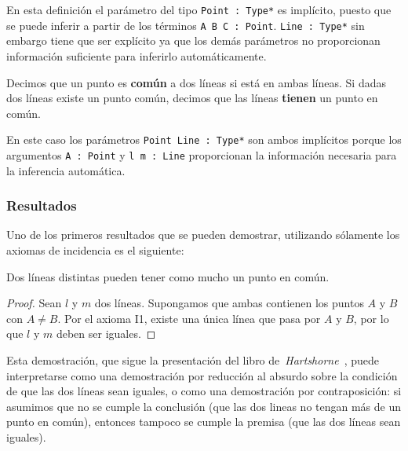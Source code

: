 
En esta definición el parámetro del tipo \lstinline{Point : Type*} es implícito,
puesto que se puede inferir a partir de los términos \lstinline{A B C : Point}.
\lstinline{Line : Type*} sin embargo tiene que ser explícito ya que los demás
parámetros no proporcionan información suficiente para inferirlo
automáticamente.

\begin{defin*}
	Decimos que un punto es \textbf{común} a dos líneas si está en ambas líneas.
	Si dadas dos líneas existe un punto común, decimos que las líneas
	\textbf{tienen} un punto en común.
\end{defin*}


En este caso los parámetros \lstinline{Point Line : Type*} son ambos implícitos
porque los argumentos \lstinline{A : Point} y \lstinline{l m : Line}
proporcionan la información necesaria para la inferencia automática.


\subsubsection{Resultados}

Uno de los primeros resultados que se pueden demostrar, utilizando sólamente los
axiomas de incidencia es el siguiente:

\begin{prop}
	Dos líneas distintas pueden tener como mucho un punto en común.
\end{prop}

\begin{proof}
	Sean $l$ y $m$ dos líneas. Supongamos que ambas contienen los puntos $A$ y
	$B$ con $A\ne B$. Por el axioma I1, existe una única línea que pasa por $A$
	y $B$, por lo que $l$ y $m$ deben ser iguales.
\end{proof}

Esta demostración, que sigue la presentación del libro
de~\textit{Hartshorne}~\cite{hartshorneGeometryEuclid2000}, puede interpretarse
como una demostración por reducción al absurdo sobre la condición de que las dos
líneas sean iguales, o como una demostración por contraposición: si asumimos que
no se cumple la conclusión (que las dos lineas no tengan más de un punto en
común), entonces tampoco se cumple la premisa (que las dos líneas sean iguales).

